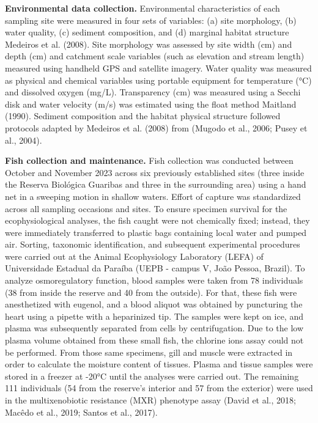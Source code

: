 \documentclass[
  american,
  letterpaper,
  DIV=11,
  numbers=noendperiod]{scrartcl}
\begin{document}
\textbf{Environmental data collection.} Environmental characteristics of
each sampling site were measured in four sets of variables: (a) site
morphology, (b) water quality, (c) sediment composition, and (d)
marginal habitat structure Medeiros et al. (2008). Site morphology was
assessed by site width (cm) and depth (cm) and catchment scale variables
(such as elevation and stream length) measured using handheld GPS and
satellite imagery. Water quality was measured as physical and chemical
variables using portable equipment for temperature (°C) and dissolved
oxygen (mg/L). Transparency (cm) was measured using a Secchi disk and
water velocity (m/s) was estimated using the float method Maitland
(1990). Sediment composition and the habitat physical structure followed
protocols adapted by Medeiros et al. (2008) from (Mugodo et al., 2006;
Pusey et al., 2004).

\textbf{Fish collection and maintenance.} Fish collection was conducted
between October and November 2023 across six previously established
sites (three inside the Reserva Biológica Guaribas and three in the
surrounding area) using a hand net in a sweeping motion in shallow
waters. Effort of capture was standardized across all sampling occasions
and sites. To ensure specimen survival for the ecophysiological
analyses, the fish caught were not chemically fixed; instead, they were
immediately transferred to plastic bags containing local water and
pumped air. Sorting, taxonomic identification, and subsequent
experimental procedures were carried out at the Animal Ecophysiology
Laboratory (LEFA) of Universidade Estadual da Paraíba (UEPB - campus V,
João Pessoa, Brazil). To analyze osmoregulatory function, blood samples
were taken from 78 individuals (38 from inside the reserve and 40 from
the outside). For that, these fish were anesthetized with eugenol, and a
blood aliquot was obtained by puncturing the heart using a pipette with
a heparinized tip. The samples were kept on ice, and plasma was
subsequently separated from cells by centrifugation. Due to the low
plasma volume obtained from these small fish, the chlorine ions assay
could not be performed. From those same specimens, gill and muscle were
extracted in order to calculate the moisture content of tissues. Plasma
and tissue samples were stored in a freezer at -20°C until the analyses
were carried out. The remaining 111 individuals (54 from the reserve's
interior and 57 from the exterior) were used in the multixenobiotic
resistance (MXR) phenotype assay (David et al., 2018; Macêdo et al.,
2019; Santos et al., 2017).
\end{document}
